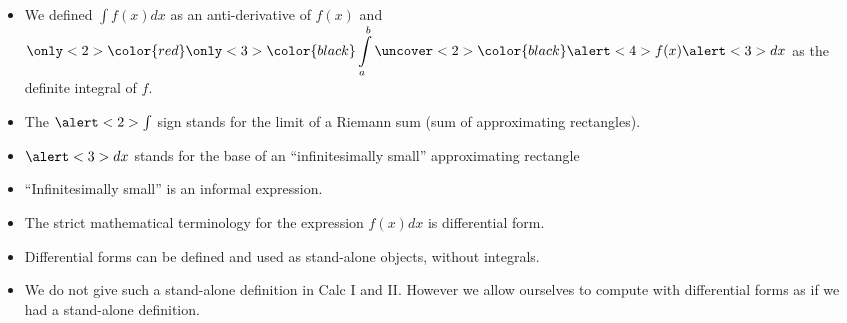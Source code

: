 \begin{frame}
\begin{itemize}
\item<1-> We defined $\int f(x) dx$ as an anti-derivative of $f(x)$ and $\displaystyle \only<2>{\color{red} }\only<3>{\color{black} } \int\limits^{b}_{a} \uncover<2>{\color{black}}  \alert<4>{f(x)}\alert<3>{ dx} $ as the definite integral of $f$.
\item<2-> The $\alert<2>{\int}$ sign stands for the \alert<2>{limit of a Riemann sum} (sum of \alert<3,4>{approximating rectangles}).
\item<3-> $\alert<3>{dx}$ stands for \alert<3>{the base} of an ``\alert<5>{infinitesimally small}'' approximating rectangle
\item<5-> ``\alert<5>{Infinitesimally small}'' is an informal expression. 
\item<6-> The strict mathematical terminology for the expression $f(x) dx$ is differential form.
\item<7-> Differential forms can be defined and used as stand-alone objects, without integrals.
\item<8-> We do not give such a stand-alone definition in Calc I and II. However we allow ourselves to compute with differential forms as if we had a stand-alone definition. 
\end{itemize}
\end{frame}

